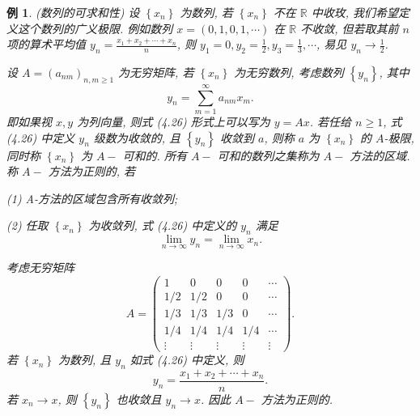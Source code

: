 \documentclass[openany]{ctexbook}
\theoremstyle{kaiti}
\theoremstyle{normal}
\newtheorem{example}{例}[section]
\begin{document}
\begin{example}
(数列的可求和性) 设 $\left\{x_n\right\}$ 为数列, 若 $\left\{x_n\right\}$ 不在 $\mathbb{R}$ 中收玫, 我们希望定义这个数列的广义极限. 例如数列 $x=(0,1,0,1, \cdots)$ 在 $\mathbb{R}$ 不收敛, 但若取其前 $n$ 项的算术平均值
$y_n=\frac{x_1+x_2+\cdots+x_n}{n}$, 则 $y_1=0, y_2=\frac{1}{2}, y_3=\frac{1}{3}, \cdots$, 易见 $y_n \rightarrow \frac{1}{2}$.

设 $A=\left(a_{n m}\right)_{n, m \geqslant 1}$ 为无穷矩阵, 若 $\left\{x_n\right\}$ 为无穷数列, 考虑数列 $\left\{y_n\right\}$, 其中
\begin{equation}
  y_n=\sum_{m=1}^{\infty} a_{n m} x_m.
\end{equation}
即如果视 $x, y$ 为列向量, 则式 (4.26) 形式上可以写为 $y=A x$. 若任给 $n \geqslant 1$, 式 (4.26) 中定义 $y_n$ 级数为收敛的, 且 $\left\{y_n\right\}$ 收敛到 $a$, 则称 $a$ 为 $\left\{x_n\right\}$ 的 $A$-极限, 同时称 $\left\{x_n\right\}$ 为 $A-$ 可和的. 所有 $A-$ 可和的数列之集称为 $A-$ 方法的区域. 称 $A-$ 方法为正则的, 若

(1) A-方法的区域包含所有收敛列;

(2) 任取 $\left\{x_n\right\}$ 为收敛列, 式 (4.26) 中定义的 $y_n$ 满足
$$
\lim_{n \rightarrow \infty} y_n=\lim_{n \rightarrow \infty} x_n.
$$

考虑无穷矩阵
$$
A=\left(\begin{array}{ccccc}
1 & 0 & 0 & 0 & \cdots \\
1 / 2 & 1 / 2 & 0 & 0 & \cdots \\
1 / 3 & 1 / 3 & 1 / 3 & 0 & \cdots \\
1 / 4 & 1 / 4 & 1 / 4 & 1 / 4 & \cdots \\
\vdots & \vdots & \vdots & \vdots & \vdots
\end{array}\right).
$$
若 $\left\{x_n\right\}$ 为数列, 且 $y_n$ 如式 (4.26) 中定义, 则
$$
y_n=\frac{x_1+x_2+\cdots+x_n}{n}.
$$
若 $x_n \rightarrow x$, 则 $\left\{y_n\right\}$ 也收敛且 $y_n \rightarrow x$. 因此 $A-$ 方法为正则的.


\end{example}
\end{document}
